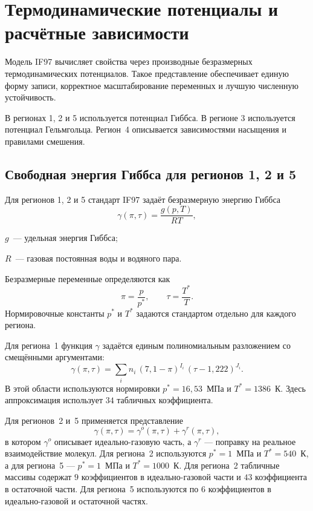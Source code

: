 \section{Термодинамические потенциалы и расчётные зависимости}

Модель IF97 вычисляет свойства через производные
безразмерных термодинамических потенциалов.
Такое представление обеспечивает единую форму записи,
корректное масштабирование переменных
и лучшую численную устойчивость.

В регионах 1, 2 и 5 используется потенциал Гиббса.
В регионе 3 используется потенциал Гельмгольца.
Регион~4 описывается зависимостями насыщения и правилами смешения.

\subsection{Свободная энергия Гиббса для регионов 1, 2 и 5}

Для регионов 1, 2 и 5 стандарт IF97 задаёт безразмерную энергию Гиббса
\begin{equation}
\gamma(\pi, \tau) = \frac{g(p, T)}{R T},
\end{equation}
\begin{gostwhere}
  \item $g$~--- удельная энергия Гиббса;
  \item $R$~--- газовая постоянная воды и водяного пара.
\end{gostwhere}

Безразмерные переменные определяются как
\begin{equation}
\pi = \frac{p}{p^{*}}, \qquad \tau = \frac{T^{*}}{T}.
\end{equation}
Нормировочные константы $p^{*}$ и $T^{*}$ задаются стандартом отдельно для каждого региона.

Для региона~1 функция $\gamma$ задаётся единым полиномиальным разложением
со смещёнными аргументами:
\begin{equation}
\gamma(\pi,\tau) = \sum_{i} n_{i}\,(7{,}1-\pi)^{I_{i}}\,(\tau-1{,}222)^{J_{i}}.
\end{equation}
В этой области используются нормировки
$p^{*}=16{,}53$~МПа и $T^{*}=1386$~К.
Здесь аппроксимация использует $34$ табличных коэффициента.

Для регионов~2 и~5 применяется представление
\begin{equation}
\gamma(\pi,\tau) = \gamma^{o}(\pi,\tau) + \gamma^{r}(\pi,\tau),
\end{equation}
в котором $\gamma^{o}$ описывает идеально-газовую часть,
а $\gamma^{r}$ --- поправку на реальное взаимодействие молекул.
Для региона~2 используются
$p^{*}=1$~МПа и $T^{*}=540$~К,
а для региона~5 ---
$p^{*}=1$~МПа и $T^{*}=1000$~К.
Для региона~2 табличные массивы содержат
$9$ коэффициентов в идеально-газовой части
и $43$ коэффициента в остаточной части.
Для региона~5 используются по $6$ коэффициентов
в идеально-газовой и остаточной частях.


